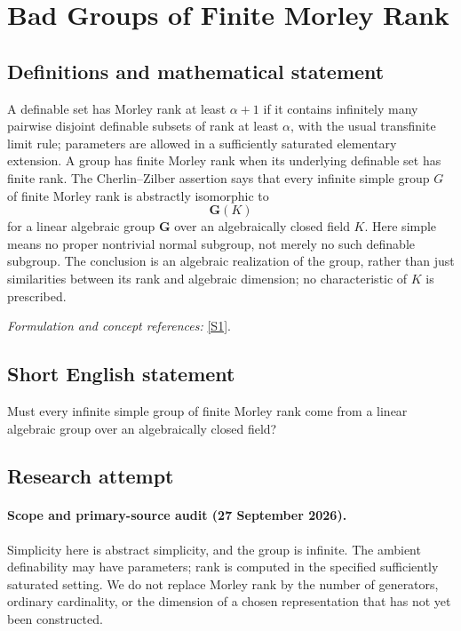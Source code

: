 \documentclass[11pt]{article}
\begin{document}
\section*{\texorpdfstring{Bad Groups of Finite Morley Rank}{Bad Groups of Finite Morley Rank}}\label{statement}
\subsection{Definitions and mathematical statement}
A definable set has Morley rank at least $\alpha+1$ if it contains infinitely many pairwise disjoint definable subsets of rank at least $\alpha$, with the usual transfinite limit rule; parameters are allowed in a sufficiently saturated elementary extension. A group has finite Morley rank when its underlying definable set has finite rank. The Cherlin--Zilber assertion says that every infinite simple group $G$ of finite Morley rank is abstractly isomorphic to
\[
 \mathbf G(K)
\]
for a linear algebraic group $\mathbf G$ over an algebraically closed field $K$. Here simple means no proper nontrivial normal subgroup, not merely no such definable subgroup. The conclusion is an algebraic realization of the group, rather than just similarities between its rank and algebraic dimension; no characteristic of $K$ is prescribed.
\par\smallskip\textit{Formulation and concept references:} \href{https://arxiv.org/abs/2606.18207}{[S1]}.

\subsection{Short English statement}
Must every infinite simple group of finite Morley rank come from a linear algebraic group over an algebraically closed field?
\subsection{Research attempt}
\paragraph{Scope and primary-source audit (27 September 2026).}
Simplicity here is abstract simplicity, and the group is infinite. The
ambient definability may have parameters; rank is computed in the
specified sufficiently saturated setting. We do not replace Morley
rank by the number of generators, ordinary cardinality, or the dimension
of a chosen representation that has not yet been constructed.
\end{document}
